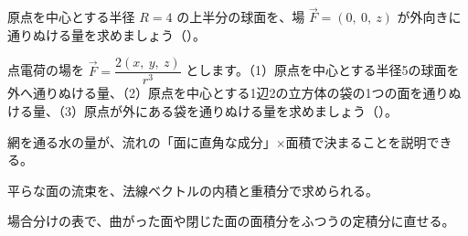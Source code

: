 \bkproblem 原点を中心とする半径 $R=4$ の上半分の球面を、場 $\vec F=(0,\ 0,\ z)$ が外向きに通りぬける量を求めましょう\mbox{（）}。

\bkproblem 点電荷の場を $\vec F=\dfrac{2(x,\ y,\ z)}{r^3}$ とします。（1）原点を中心とする半径5の球面を外へ通りぬける量、（2）原点を中心とする1辺2の立方体の袋の1つの面を通りぬける量、（3）原点が外にある袋を通りぬける量を求めましょう\mbox{（）}。

\begin{furikaeri}
\begin{checklist}
\item 網を通る水の量が、流れの「面に直角な成分」×面積で決まることを説明できる。
\item 平らな面の流束を、法線ベクトルの内積と重積分で求められる。
\item 場合分けの表で、曲がった面や閉じた面の面積分をふつうの定積分に直せる。
\end{checklist}
\end{furikaeri}

